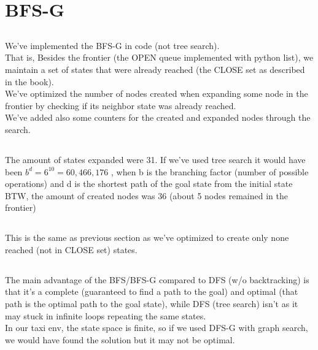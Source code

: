 \documentclass[12pt]{article}
\begin{document}
\section{BFS-G}

\subsection{}
We've implemented the BFS-G in code (not tree search).\\
That is, Besides the frontier (the OPEN queue implemented with python list), we maintain a set of states that were already reached (the CLOSE set as described in the book).\\
We've optimized the number of nodes created when expanding some node in the frontier by checking if its neighbor state was already reached.\\
We've added also some counters for the created and expanded nodes through the search.\\

\subsection{}
The amount of states expanded were 31. If we've used tree search it would have been $b^d=6^10=60,466,176$ , when b is the branching factor (number of possible operations) and d is the shortest path of the goal state from the initial state\\
BTW, the amount of created nodes was 36 (about 5 nodes remained in the frontier)\\

\subsection{}
This is the same as previous section as we've optimized to create only none reached (not in CLOSE set) states.

\subsection{}
The main advantage of the BFS/BFS-G compared to DFS (w/o backtracking) is that it's a complete (guaranteed to find a path to the goal) and optimal (that path is the optimal path to the goal state), while DFS (tree search) isn't as it may stuck in infinite loops repeating the same states.\\

In our taxi env, the state space is finite, so if we used DFS-G with graph search, we would have found the solution but it may not be optimal.\\
\end{document}

